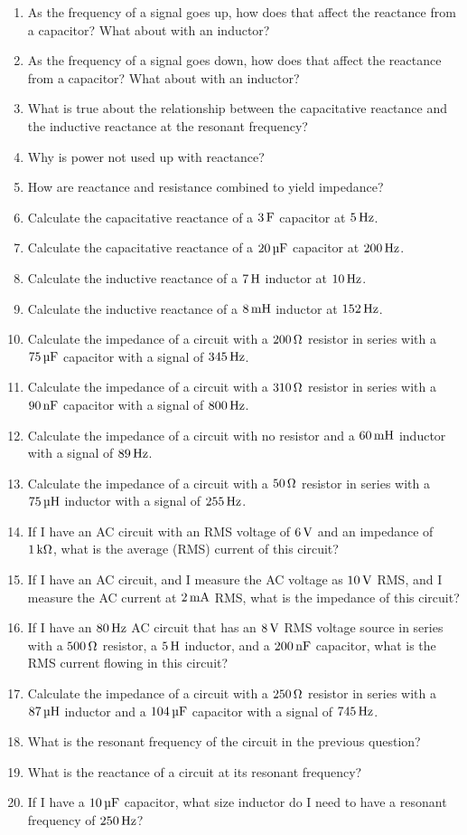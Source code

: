 
\begin{enumerate}
\item As the frequency of a signal goes up, how does that affect the reactance from a capacitor?  What about with an inductor?
\item As the frequency of a signal goes down, how does that affect the reactance from a capacitor?  What about with an inductor?
\item What is true about the relationship between the capacitative reactance and the inductive reactance at the resonant frequency?
\item Why is power not used up with reactance?
\item How are reactance and resistance combined to yield impedance?
\item Calculate the capacitative reactance of a $3\,\si{\farad}$ capacitor at $5\,\si{\hertz}$.
\item Calculate the capacitative reactance of a $20\,\si{\micro\farad}$ capacitor at $200\,\si{\hertz}$.
\item Calculate the inductive reactance of a $7\myhy$ inductor at $10\,\si{\hertz}$.
\item Calculate the inductive reactance of a $8\mymhy$ inductor at $152\,\si{\hertz}$.
\item Calculate the impedance of a circuit with a $200\,\si{\ohm}$ resistor in series with a $75\,\si{\micro\farad}$ capacitor with a signal of $345\,\si{\hertz}$.
\item Calculate the impedance of a circuit with a $310\,\si{\ohm}$ resistor in series with a $90\,\si{\nano\farad}$ capacitor with a signal of $800\,\si{\hertz}$.
\item Calculate the impedance of a circuit with no resistor and a $60\mymhy$ inductor with a signal of $89\,\si{\hertz}$.
\item Calculate the impedance of a circuit with a $50\,\si{\ohm}$ resistor in series with a $75\myuhy$ inductor with a signal of $255\,\si{\hertz}$.
\item If I have an AC circuit with an RMS voltage of $6\,\si{\volt}$ and an impedance of $1\,\si{\kilo\ohm}$, what is the average (RMS) current of this circuit?
\item If I have an AC circuit, and I measure the AC voltage as $10\,\si{\volt}$ RMS, and I measure the AC current at $2\,\si{\milli\ampere}$ RMS, what is the impedance of this circuit?
\item If I have an $80\,\si{\hertz}$ AC circuit that has an $8\,\si{\volt}$ RMS voltage source in series with a $500\,\si{\ohm}$ resistor, a $5\myhy$ inductor, and a $200\,\si{\nano\farad}$ capacitor, what is the RMS current flowing in this circuit?
\item Calculate the impedance of a circuit with a $250\,\si{\ohm}$ resistor in series with a $87\myuhy$ inductor and a $104\,\si{\micro\farad}$ capacitor with a signal of $745\,\si{\hertz}$.
\item What is the resonant frequency of the circuit in the previous question?
\item What is the reactance of a circuit at its resonant frequency?
\item If I have a $10\,\si{\micro\farad}$ capacitor, what size inductor do I need to have a resonant frequency of $250\,\si{\hertz}$?
\end{enumerate}
